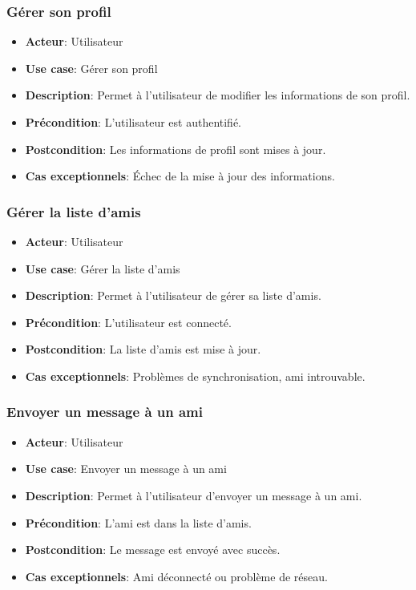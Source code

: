 \documentclass{article}
\begin{document}
\subsubsection*{Gérer son profil}
\begin{itemize}
    \item \textbf{Acteur}: Utilisateur
    \item \textbf{Use case}: Gérer son profil
    \item \textbf{Description}: Permet à l'utilisateur de modifier les informations de son profil.
    \item \textbf{Précondition}: L'utilisateur est authentifié.
    \item \textbf{Postcondition}: Les informations de profil sont mises à jour.
    \item \textbf{Cas exceptionnels}: Échec de la mise à jour des informations.
\end{itemize}

\subsubsection*{Gérer la liste d'amis}
\begin{itemize}
    \item \textbf{Acteur}: Utilisateur
    \item \textbf{Use case}: Gérer la liste d'amis
    \item \textbf{Description}: Permet à l'utilisateur de gérer sa liste d'amis.
    \item \textbf{Précondition}: L'utilisateur est connecté.
    \item \textbf{Postcondition}: La liste d'amis est mise à jour.
    \item \textbf{Cas exceptionnels}: Problèmes de synchronisation, ami introuvable.
\end{itemize}

\subsubsection*{Envoyer un message à un ami}
\begin{itemize}
    \item \textbf{Acteur}: Utilisateur
    \item \textbf{Use case}: Envoyer un message à un ami
    \item \textbf{Description}: Permet à l'utilisateur d'envoyer un message à un ami.
    \item \textbf{Précondition}: L'ami est dans la liste d'amis.
    \item \textbf{Postcondition}: Le message est envoyé avec succès.
    \item \textbf{Cas exceptionnels}: Ami déconnecté ou problème de réseau.
\end{itemize}
\end{document}
